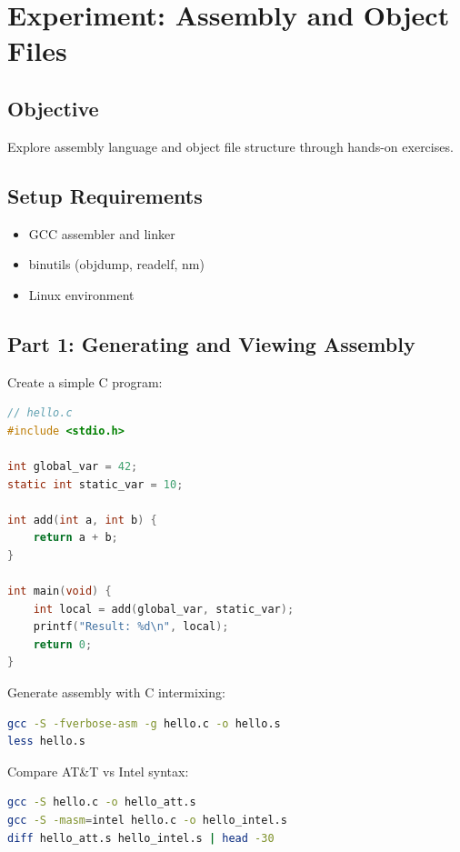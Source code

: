 \section{Experiment: Assembly and Object Files}

\subsection{Objective}
Explore assembly language and object file structure through hands-on exercises.

\subsection{Setup Requirements}
\begin{itemize}
\item GCC assembler and linker
\item binutils (objdump, readelf, nm)
\item Linux environment
\end{itemize}

\subsection{Part 1: Generating and Viewing Assembly}

Create a simple C program:

\begin{lstlisting}[language=C]
// hello.c
#include <stdio.h>

int global_var = 42;
static int static_var = 10;

int add(int a, int b) {
    return a + b;
}

int main(void) {
    int local = add(global_var, static_var);
    printf("Result: %d\n", local);
    return 0;
}
\end{lstlisting}

Generate assembly with C intermixing:

\begin{lstlisting}[language=bash]
gcc -S -fverbose-asm -g hello.c -o hello.s
less hello.s
\end{lstlisting}

Compare AT\&T vs Intel syntax:

\begin{lstlisting}[language=bash]
gcc -S hello.c -o hello_att.s
gcc -S -masm=intel hello.c -o hello_intel.s
diff hello_att.s hello_intel.s | head -30
\end{lstlisting}

